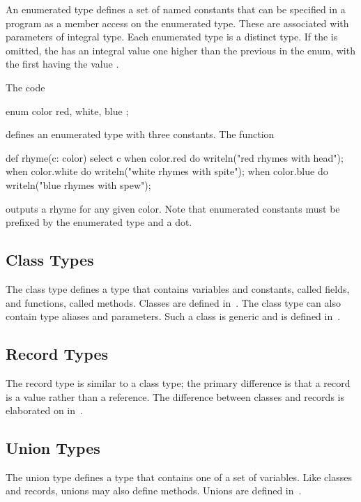 An enumerated type defines a set of named constants that can be
specified in a program as a member access on the enumerated type.
These are associated with parameters of integral type.  Each
enumerated type is a distinct type. If the  is
omitted, the  has an integral value one higher
than the previous  in the enum, with the first
having the value .

\begin{example}
The code
\begin{chapel}
enum color { red, white, blue } ;
\end{chapel}
defines an enumerated type with three constants.  The function
\begin{chapel}
def rhyme(c: color) {
  select c {
    when color.red do writeln("red rhymes with head");
    when color.white do writeln("white rhymes with spite");
    when color.blue do writeln("blue rhymes with spew");
  }
}
\end{chapel}
outputs a rhyme for any given color.  Note that enumerated constants
must be prefixed by the enumerated type and a dot.
\end{example}

\subsection{Class Types}

The class type defines a type that contains variables and constants,
called fields, and functions, called methods.  Classes are defined
in~.  The class type can also contain type aliases and
parameters.  Such a class is generic and is defined
in~.

\subsection{Record Types}

The record type is similar to a class type; the primary difference is
that a record is a value rather than a reference.  The difference
between classes and records is elaborated on in~.

\subsection{Union Types}

The union type defines a type that contains one of a set of variables.
Like classes and records, unions may also define methods.  Unions are
defined in~.

